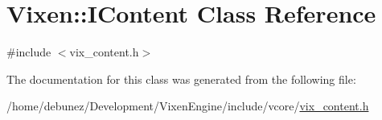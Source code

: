 \hypertarget{classVixen_1_1IContent}{}\section{Vixen\+:\+:I\+Content Class Reference}
\label{classVixen_1_1IContent}


{\ttfamily \#include $<$vix\+\_\+content.\+h$>$}



The documentation for this class was generated from the following file\+:\begin{DoxyCompactItemize}
\item 
/home/debunez/\+Development/\+Vixen\+Engine/include/vcore/\hyperlink{vix__content_8h}{vix\+\_\+content.\+h}\end{DoxyCompactItemize}
